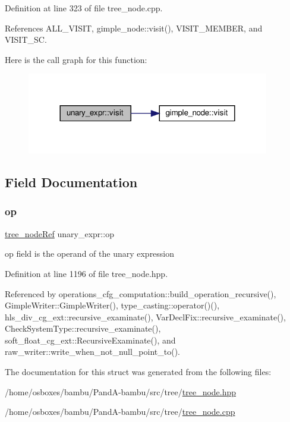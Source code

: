 Definition at line 323 of file tree\+\_\+node.\+cpp.



References A\+L\+L\+\_\+\+V\+I\+S\+IT, gimple\+\_\+node\+::visit(), V\+I\+S\+I\+T\+\_\+\+M\+E\+M\+B\+ER, and V\+I\+S\+I\+T\+\_\+\+SC.

Here is the call graph for this function\+:
\nopagebreak
\begin{figure}[H]
\begin{center}
\leavevmode
\includegraphics[width=300pt]{df/dd2/structunary__expr_a0373bfbbec394ab8d9e88b5ff6d60890_cgraph}
\end{center}
\end{figure}


\subsection{Field Documentation}
\mbox{\label{structunary__expr_ac4faefe96634e5b9be37c23ab3ad74d1}} 
\subsubsection{\texorpdfstring{op}{op}}
{\footnotesize\ttfamily \hyperlink{tree__node_8hpp_a6ee377554d1c4871ad66a337eaa67fd5}{tree\+\_\+node\+Ref} unary\+\_\+expr\+::op}



op field is the operand of the unary expression 



Definition at line 1196 of file tree\+\_\+node.\+hpp.



Referenced by operations\+\_\+cfg\+\_\+computation\+::build\+\_\+operation\+\_\+recursive(), Gimple\+Writer\+::\+Gimple\+Writer(), type\+\_\+casting\+::operator()(), hls\+\_\+div\+\_\+cg\+\_\+ext\+::recursive\+\_\+examinate(), Var\+Decl\+Fix\+::recursive\+\_\+examinate(), Check\+System\+Type\+::recursive\+\_\+examinate(), soft\+\_\+float\+\_\+cg\+\_\+ext\+::\+Recursive\+Examinate(), and raw\+\_\+writer\+::write\+\_\+when\+\_\+not\+\_\+null\+\_\+point\+\_\+to().



The documentation for this struct was generated from the following files\+:\begin{DoxyCompactItemize}
\item 
/home/osboxes/bambu/\+Pand\+A-\/bambu/src/tree/\hyperlink{tree__node_8hpp}{tree\+\_\+node.\+hpp}\item 
/home/osboxes/bambu/\+Pand\+A-\/bambu/src/tree/\hyperlink{tree__node_8cpp}{tree\+\_\+node.\+cpp}\end{DoxyCompactItemize}
